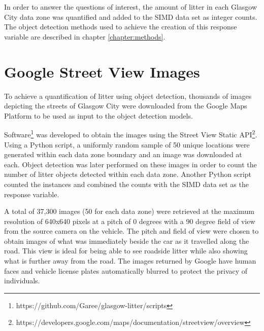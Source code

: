 \documentclass{thesis}
\begin{document}
In order to answer the questions of interest, the amount of litter in each Glasgow City data zone was quantified and added to the SIMD data set as integer counts. The object detection methods used to achieve the creation of this response variable are  described in chapter \ref{chapter:methods}.

\section{Google Street View Images}

To achieve a quantification of litter using object detection, thousands of images depicting the streets of Glasgow City were downloaded from the Google Maps Platform to be used as input to the object detection models. 

Software\footnote{https://github.com/Garee/glasgow-litter/scripts} was developed to obtain the images using the Street View Static API\footnote{https://developers.google.com/maps/documentation/streetview/overview}. Using a Python script, a uniformly random sample of 50 unique locations were generated within each data zone boundary and an image was downloaded at each. Object detection was later performed on these images in order to count the number of litter objects detected within each data zone. Another Python script counted the instances and combined the counts with the SIMD data set as the response variable. 

A total of 37,300 images (50 for each data zone) were retrieved at the maximum resolution of 640x640 pixels at a pitch of 0 degrees with a 90 degree field of view from the source camera on the vehicle. The pitch and field of view were chosen to obtain images of what was immediately beside the car as it travelled along the road. This view is ideal for being able to see roadside litter while also showing what is further away from the road. The images returned by Google have human faces and vehicle license plates automatically blurred to protect the privacy of individuals.
\end{document}
